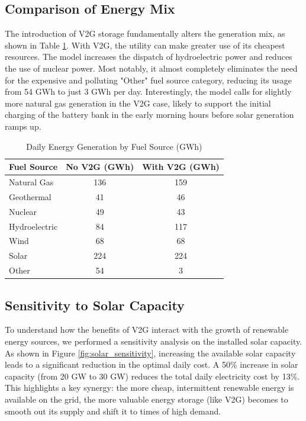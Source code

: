 \documentclass[12pt, letterpaper]{article}
\begin{document}
\subsection{Comparison of Energy Mix}
The introduction of V2G storage fundamentally alters the generation mix, as shown in Table \ref{tab:fuel_mix}. With V2G, the utility can make greater use of its cheapest resources. The model increases the dispatch of hydroelectric power and reduces the use of nuclear power. Most notably, it almost completely eliminates the need for the expensive and polluting "Other" fuel source category, reducing its usage from 54 GWh to just 3 GWh per day. Interestingly, the model calls for slightly more natural gas generation in the V2G case, likely to support the initial charging of the battery bank in the early morning hours before solar generation ramps up.

\begin{table}[H]
\centering
\caption{Daily Energy Generation by Fuel Source (GWh)}
\label{tab:fuel_mix}
\begin{tabular}{@{}lcc@{}}
\toprule
\textbf{Fuel Source} & \textbf{No V2G (GWh)} & \textbf{With V2G (GWh)} \\ \midrule
Natural Gas        & 136                   & 159                     \\
Geothermal         & 41                    & 46                      \\
Nuclear            & 49                    & 43                      \\
Hydroelectric      & 84                    & 117                     \\
Wind               & 68                    & 68                      \\
Solar              & 224                   & 224                     \\
Other              & 54                    & 3                       \\ \bottomrule
\end{tabular}
\end{table}

\subsection{Sensitivity to Solar Capacity}
To understand how the benefits of V2G interact with the growth of renewable energy sources, we performed a sensitivity analysis on the installed solar capacity. As shown in Figure \ref{fig:solar_sensitivity}, increasing the available solar capacity leads to a significant reduction in the optimal daily cost. A 50\% increase in solar capacity (from 20 GW to 30 GW) reduces the total daily electricity cost by 13\%. This highlights a key synergy: the more cheap, intermittent renewable energy is available on the grid, the more valuable energy storage (like V2G) becomes to smooth out its supply and shift it to times of high demand.
\end{document}
